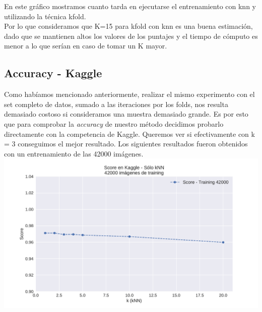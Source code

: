 En este gráfico mostramos cuanto tarda en ejecutarse el entrenamiento con knn y utilizando la técnica kfold.\\

Por lo que consideramos que K=15 para kfold con knn es una buena estimación, dado que se mantienen altos los valores de los puntajes y el tiempo de cómputo es menor a lo que serían en caso de tomar un K mayor.\\



\newpage


















\subsection{Accuracy - Kaggle}

Como habíamos mencionado anteriormente, realizar el mismo experimento con el set completo de datos, sumado a las iteraciones por los folds, nos resulta demasiado costoso si consideramos una muestra demasiado grande. Es por esto que para comprobar la \textit{accuracy} de nuestro método decidimos probarlo directamente con la competencia de Kaggle. Queremos ver si efectivamente con k = 3 conseguimos el mejor resultado. Los siguientes resultados fueron obtenidos con un entrenamiento de las 42000 imágenes.\\

{\centering
    \includegraphics[scale=0.60]{informe/imagenes/knn/kaggleknn.pdf} \\
}
$ $\newline

